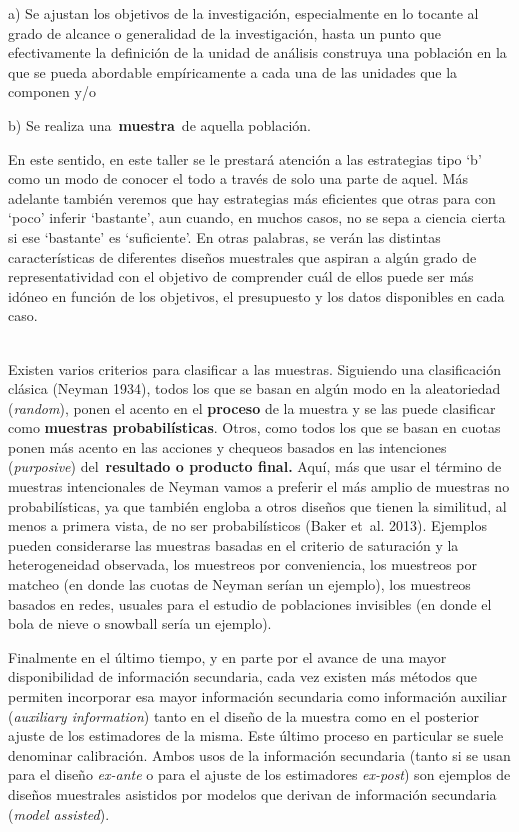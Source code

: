 \documentclass[
  spanish,
  a4paper,
]{scrreprt}
\begin{document}
a) Se ajustan los objetivos de la investigación, especialmente en lo
tocante al grado de alcance o generalidad de la investigación, hasta un
punto que efectivamente la definición de la unidad de análisis construya
una población en la que se pueda abordable empíricamente a cada una de
las unidades que la componen y/o

b) Se realiza una~\textbf{muestra}~de aquella población.

En este sentido, en este taller se le prestará atención a las
estrategias tipo `b' como un modo de conocer el todo a través de solo
una parte de aquel. Más adelante también veremos que hay estrategias más
eficientes que otras para con `poco' inferir `bastante', aun cuando, en
muchos casos, no se sepa a ciencia cierta si ese `bastante' es
`suficiente'. En otras palabras, se verán las distintas características
de diferentes diseños muestrales que aspiran a algún grado de
representatividad con el objetivo de comprender cuál de ellos puede ser
más idóneo en función de los objetivos, el presupuesto y los datos
disponibles en cada caso.~\\
\strut \\
Existen varios criterios para clasificar a las muestras. Siguiendo una
clasificación clásica (Neyman 1934), todos los que se basan en algún
modo en la aleatoriedad (\emph{random}), ponen el acento en el
\textbf{proceso} de la muestra y se las puede clasificar como
\textbf{muestras probabilísticas}. Otros, como todos los que se basan en
cuotas ponen más acento en las acciones y chequeos basados en las
intenciones (\emph{purposive}) del~\textbf{resultado o producto final.}
Aquí, más que usar el término de muestras intencionales de Neyman vamos
a preferir el más amplio de muestras no probabilísticas, ya que también
engloba a otros diseños que tienen la similitud, al menos a primera
vista, de no ser probabilísticos (Baker et~al. 2013). Ejemplos pueden
considerarse las muestras basadas en el criterio de saturación y la
heterogeneidad observada, los muestreos por conveniencia, los muestreos
por matcheo (en donde las cuotas de Neyman serían un ejemplo), los
muestreos basados en redes, usuales para el estudio de poblaciones
invisibles (en donde el bola de nieve o snowball sería un ejemplo).

Finalmente en el último tiempo, y en parte por el avance de una mayor
disponibilidad de información secundaria, cada vez existen más métodos
que permiten incorporar esa mayor información secundaria como
información auxiliar (\emph{auxiliary information}) tanto en el diseño
de la muestra como en el posterior ajuste de los estimadores de la
misma. Este último proceso en particular se suele denominar calibración.
Ambos usos de la información secundaria (tanto si se usan para el diseño
\emph{ex-ante} o para el ajuste de los estimadores \emph{ex-post}) son
ejemplos de diseños muestrales asistidos por modelos que derivan de
información secundaria (\emph{model assisted}).
\end{document}
